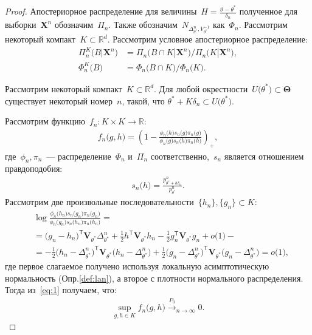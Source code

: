 \documentclass[12pt, twoside]{article}
\numberwithin{equation}{section}
\begin{document}
\begin{proof}
Апостериорное распределение для величины~$H=\frac{\vartheta-\theta^*}{\delta_n}$ полученное для выборки~$\textbf{X}^{n}$ обозначим~$\Pi_n$. Также обозначим~$N_{\Delta^n_{\theta^*}, V_{\theta^*}^{-1}}$ как~$\Phi_n$.
Рассмотрим некоторый компакт~$K \subset \mathbb{R}^{d}$. Рассмотрим условное апостериорное распределение:
\[
\begin{aligned}
\Pi_n^K\bigr(B|\textbf{X}^n\bigr) &= \Pi_n\bigr(B \cap K | \textbf{X}^n\bigr)/\Pi_n\bigr(K|\textbf{X}^n\bigr),\\
\Phi_n^K\bigr(B\bigr) &= \Phi_n\bigr(B \cap K\bigr)/\Phi_n\bigr(K\bigr).
\end{aligned}
\]

Рассмотрим некоторый компакт~$K \subset \mathbb{R}^{d}$. Для любой окрестности~$U\bigr(\theta^*\bigr) \subset \bm{\Theta}$ существует некоторый номер~$n$, такой, что $\theta^*+K\delta_n\subset U\bigr(\theta^*\bigr)$.

Рассмотрим функцию~$f_n:K\times K \to \mathbb{R}:$
\[
\begin{aligned}
f_n\bigr(g, h\bigr) = \left(1-\frac{\phi_n\bigr(h\bigr)s_n\bigr(g\bigr)\pi_n\bigr(g\bigr)}{\phi_n\bigr(g\bigr)s_n\bigr(h\bigr)\pi_n\bigr(h\bigr)}\right)_+,
\end{aligned}
\]
где~$\phi_n, \pi_n$~--- распределение~$\Phi_n$ и~$\Pi_n$ соответственно,~$s_n$ является отношением правдоподобия:
\[
\begin{aligned}
s_n\bigr(h\bigr) = \frac{p^n_{\theta^*+h\delta_n}}{p^n_{\theta^*}}.
\end{aligned}
\]
Рассмотрим две произвольные последовательности~$\{h_n\}, \{g_n\} \subset K$:
\[
\label{eq:1}
\begin{aligned}
&\log\frac{\phi_n\bigr(h_n\bigr)s_n\bigr(g_n\bigr)\pi_n\bigr(g_n\bigr)}{\phi_n\bigr(g_n\bigr)s_n\bigr(h_n\bigr)\pi_n\bigr(h_n\bigr)} =\\
&= \bigr(g_n-h_n\bigr)^{\mathsf{T}}\textbf{V}_{\theta^*}\Delta^n_{\theta^*}+\frac{1}{2}h^{\mathsf{T}}\textbf{V}_{\theta^*}h_n-\frac{1}{2}g_n^{\mathsf{T}}\textbf{V}_{\theta^*}g_n + o\bigr(1\bigr) -\\
&= -\frac{1}{2}\bigr(h_n-\Delta^{n}_{\theta^*}\bigr)^{\mathsf{T}}\textbf{V}_{\theta^*}\bigr(h_n-\Delta^{n}_{\theta^*}\bigr) + \frac{1}{2}\bigr(g_n-\Delta^{n}_{\theta^*}\bigr)^{\mathsf{T}}\textbf{V}_{\theta^*}\bigr(g_n-\Delta^{n}_{\theta^*}\bigr) = o\bigr(1\bigr),
\end{aligned}
\]
где первое слагаемое получено используя локальную асимптотическую нормальность (Опр.\ref{def:lan}), а второе с плотности нормального распределения. Тогда из~\eqref{eq:1} получаем, что:
\[
\label{eq:2}
\begin{aligned}
\sup_{g,h\in K}f_n\bigr(g, h\bigr) \overset{P_0}{\to}_{n \to \infty} 0.
\end{aligned}
\]


\end{proof}
\end{document}

